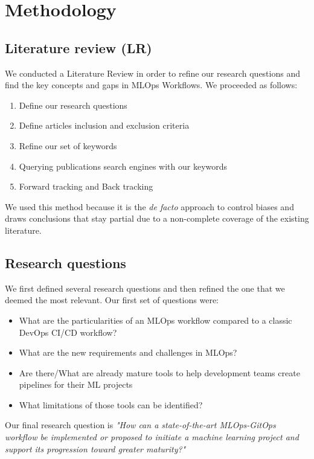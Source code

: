 \section{Methodology}\label{sec:methodo}
\subsection{Literature review (LR)}\label{subsec:literature-review-(lr)}

We conducted a Literature Review in order to refine our research questions and find the key concepts and gaps in MLOps Workflows.
We proceeded as follows:

\begin{enumerate}
    \item Define our research questions
    \item Define articles inclusion and exclusion criteria
    \item Refine our set of keywords
    \item Querying publications search engines with our keywords
    \item Forward tracking and Back tracking
\end{enumerate}

We used this method because it is the \textit{de facto} approach to control biases and draws conclusions that stay partial due to
a non-complete coverage of the existing literature.

\subsection{Research questions}\label{subsec:research-questions}

We first defined several research questions and then refined the one that we deemed the most relevant.
Our first set of questions were:
\begin{itemize}
    \item What are the particularities of an MLOps workflow compared to a classic DevOps CI/CD workflow?
    \item What are the new requirements and challenges in MLOps?
    \item Are there/What are already mature tools to help development teams create pipelines for their ML projects
    \item What limitations of those tools can be identified?
\end{itemize}

Our final research question is
\textit{"How can a state-of-the-art MLOps-GitOps workflow be implemented or proposed to initiate a machine learning project and support its progression toward greater maturity?"\cite{mlops-definition-tools-and-challenge,mlops-maturity-model}}

